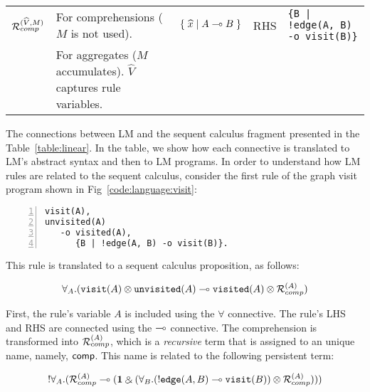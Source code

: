 \begin{table*}
\begin{center}
{\begin{tabular}{ | l | l || l | l | l |}
                                 $\mathcal{R}_{comp}^{(\widehat{V}, M)}$               & For comprehensions
    ($M$ is not used).  & $\{ \; \widehat{x} \; | \; A \multimap B \; \}$  & RHS & \texttt{\{B | !edge(A, B) -o visit(B)\}}        \\
    & For aggregates ($M$ accumulates). $\widehat{V}$ captures rule variables.          &                                               &                 &                                                \\ \hline
    \end{tabular}
}
\end{center}
\caption{Connectives from linear logic and their use in LM.}
\label{table:linear}
\end{table*}

The connections between LM and the sequent calculus fragment presented in the
Table~\ref{table:linear}. In the table, we show how each connective is
translated to LM's abstract syntax and then to LM programs. In order to
understand how LM rules are related to the sequent calculus, consider the first
rule of the graph visit program shown in Fig~\ref{code:language:visit}:

\begin{Verbatim}[numbers=left,fontsize=\codesize,commandchars=\*\[\]]
visit(A),
unvisited(A)
   -o visited(A),
      {B | !edge(A, B) -o visit(B)}.
\end{Verbatim}

This rule is translated to a sequent calculus proposition, as follows:

\begin{align}
\forall_A. (\texttt{visit}(A) \otimes \texttt{unvisited}(A) \multimap
   \texttt{visited}(A) \otimes \mathcal{R}_{comp}^{(A)})
\end{align}

First, the rule's variable $A$ is included using the $\forall$ connective. The
rule's LHS and RHS are connected using the $\multimap$ connective. The
comprehension is transformed into $\mathcal{R}_{comp}^{(A)}$, which is a
\emph{recursive} term that is assigned to an unique name, namely, $\mathsf{comp}$.
This name is related to the following persistent term:

\begin{align}
{!} \forall_A. (\mathcal{R}_{comp}^{(A)} \multimap (\mathbf{1} \mathbin{\binampersand}
         (\forall_B. ({!} \texttt{edge}(A, B) \multimap
                                             \texttt{visit}(B)) \otimes
          \mathcal{R}_{comp}^{(A)})))
\end{align}

